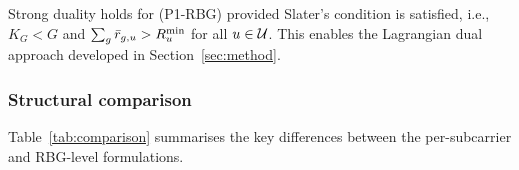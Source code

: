 \begin{remark}
\label{rmk:slater}
Strong duality holds for (P1-RBG) provided Slater's condition is satisfied, i.e., $K_G < G$ and $\sum_g \bar{r}_{g,u} > R^{\min}_u$ for all $u \in \mathcal{U}$.
This enables the Lagrangian dual approach developed in Section~\ref{sec:method}.
\end{remark}

\subsubsection{Structural comparison}
Table~\ref{tab:comparison} summarises the key differences between the per-subcarrier and RBG-level formulations.


